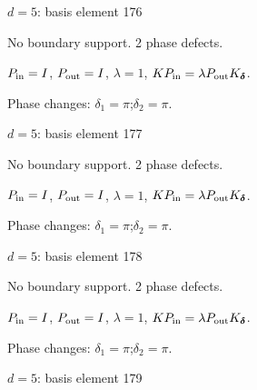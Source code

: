 \vfill
{\footnotesize\texttt{}}
\newpage
{}
{\Large $d=5$: basis element 176}\par
No boundary support. 2 phase defects.
\begin{center}
\end{center}
\vspace{-1mm}
$P_{\rm in}=I$, \quad $P_{\rm out}=I$, \quad $\lambda=1$, \qquad $K P_{\rm in}=\lambda P_{\rm out}K_{\boldsymbol\delta}$.
\par\smallskip\begin{minipage}{.98\linewidth}\small Phase changes: $\delta_{1}=\pi$;\quad $\delta_{2}=\pi$.\end{minipage}
\vfill
{\footnotesize\texttt{}}
\newpage
{}
{\Large $d=5$: basis element 177}\par
No boundary support. 2 phase defects.
\begin{center}
\end{center}
\vspace{-1mm}
$P_{\rm in}=I$, \quad $P_{\rm out}=I$, \quad $\lambda=1$, \qquad $K P_{\rm in}=\lambda P_{\rm out}K_{\boldsymbol\delta}$.
\par\smallskip\begin{minipage}{.98\linewidth}\small Phase changes: $\delta_{1}=\pi$;\quad $\delta_{2}=\pi$.\end{minipage}
\vfill
{\footnotesize\texttt{}}
\newpage
{}
{\Large $d=5$: basis element 178}\par
No boundary support. 2 phase defects.
\begin{center}
\end{center}
\vspace{-1mm}
$P_{\rm in}=I$, \quad $P_{\rm out}=I$, \quad $\lambda=1$, \qquad $K P_{\rm in}=\lambda P_{\rm out}K_{\boldsymbol\delta}$.
\par\smallskip\begin{minipage}{.98\linewidth}\small Phase changes: $\delta_{1}=\pi$;\quad $\delta_{2}=\pi$.\end{minipage}
\vfill
{\footnotesize\texttt{}}
\newpage
{}
{\Large $d=5$: basis element 179}\par
